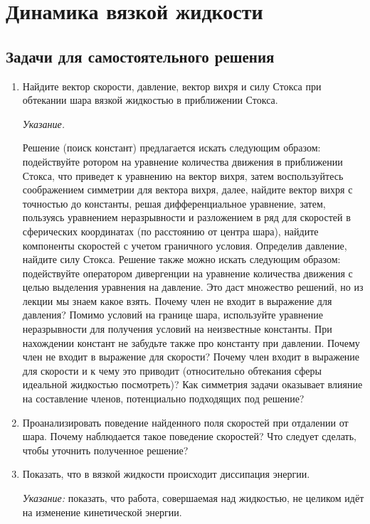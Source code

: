 \documentclass[a4paper, 14pt]{extarticle}
\begin{document}
\section{Динамика вязкой жидкости}

\subsection{Задачи для самостоятельного решения}

\begin{enumerate}
	
	\item Найдите вектор скорости, давление, вектор вихря и силу Стокса при обтекании шара вязкой жидкостью в приближении Стокса.
	
	{\small
	\textit{Указание.}	
	
	Решение (поиск констант) предлагается искать следующим образом: подействуйте ротором на уравнение количества движения в приближении Стокса, что приведет к уравнению на вектор вихря, затем воспользуйтесь соображением симметрии для вектора вихря, далее, найдите вектор вихря с точностью до константы, решая дифференциальное уравнение, затем, пользуясь уравнением неразрывности и разложением в ряд для скоростей в сферических координатах (по расстоянию от центра шара), найдите компоненты скоростей с учетом граничного условия. Определив давление, найдите силу Стокса.  \newline		
	Решение  также можно искать следующим образом: подействуйте оператором дивергенции на уравнение количества движения с целью выделения уравнения на давление. Это даст множество решений, но из лекции мы знаем какое взять. Почему член  не входит в выражение для давления? Помимо условий на границе шара, используйте уравнение неразрывности для получения условий на неизвестные константы. При нахождении констант не забудьте также про константу при давлении. Почему член  не входит в выражение для скорости? Почему член  входит в выражение для скорости и к чему это приводит (относительно обтекания сферы идеальной жидкостью посмотреть)? Как симметрия задачи оказывает влияние на составление членов, потенциально подходящих под решение?
	}

	\item 
	Проанализировать поведение найденного поля скоростей при отдалении от шара. Почему наблюдается такое поведение скоростей? Что следует сделать, чтобы уточнить полученное решение? 
	
	\item
	Показать, что в вязкой жидкости происходит диссипация энергии.
	 
	{\small \textit{Указание:} показать, что работа, совершаемая над жидкостью, не целиком идёт на изменение кинетической энергии.}

\end{enumerate}
\end{document}
